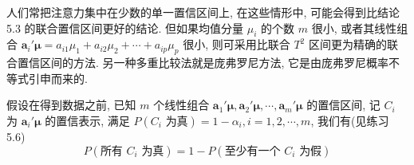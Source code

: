 
人们常把注意力集中在少数的单一置信区间上, 在这些情形中, 可能会得到比结论 5.3 的联合置信区间更好的结论. 但如果均值分量 $\mu_{i}$ 的个数 $m$ 很小, 或者其线性组合 $\mathbf{a}_{i}'\boldsymbol{\mu}=a_{i1}\mu_{1}+a_{i2}\mu_{2}+\cdots+a_{ip}\mu_{p}$ 很小, 则可采用比联合 $T^{2}$ 区间更为精确的联合置信区间的方法. 另一种多重比较法就是庞弗罗尼方法, 它是由庞弗罗尼概率不等式引申而来的.

假设在得到数据之前, 已知 $m$ 个线性组合 $\mathbf{a}_{1}'\boldsymbol{\mu},\mathbf{a}_{2}'\boldsymbol{\mu},\cdots,\mathbf{a}_{m}'\boldsymbol{\mu}$ 的置信区间, 记 $C_{i}$ 为 $\mathbf{a}_{i}'\boldsymbol{\mu}$ 的置信表示, 满足 $P(C_{i}\text{ 为真})=1-\alpha_{i}, i=1,2,\cdots,m$, 我们有(见练习 5.6)
\[
P(\text{所有 }C_{i}\text{ 为真})=1-P(\text{至少有一个 }C_{i}\text{ 为假})
\]
